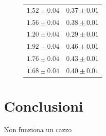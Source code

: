\documentclass{article}
\begin{document}
\begin{figure}[h]
\begin{multicols}{2}
\begin{center}
\begin{tabular}{c|c}
$1.52 \pm 0.04 $&$0.37 \pm 0.01$\\

$1.56 \pm 0.04 $&$0.38 \pm 0.01$\\

$1.20 \pm 0.04 $&$0.29 \pm 0.01$\\

$1.92 \pm 0.04 $&$0.46 \pm 0.01$\\

$1.76 \pm 0.04 $&$0.43 \pm 0.01$\\

$1.68 \pm 0.04 $&$0.40 \pm 0.01$\\

\end{tabular}
\end{center} 
\end{multicols}
\end{figure}

\newpage

\section{Conclusioni}
\lipsum[1-2]
Non funziona un cazzo
\end{document}
